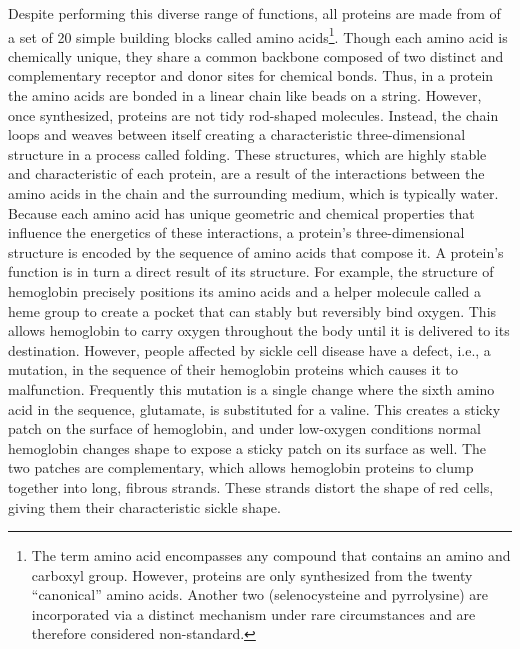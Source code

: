 Despite performing this diverse range of functions, all proteins are made from of a set of 20 simple building blocks called amino acids\footnote{The term amino acid encompasses any compound that contains an amino and carboxyl group. However, proteins are only synthesized from the twenty ``canonical'' amino acids. Another two (selenocysteine and pyrrolysine) are incorporated via a distinct mechanism under rare circumstances and are therefore considered non-standard.}. Though each amino acid is chemically unique, they share a common backbone composed of two distinct and complementary receptor and donor sites for chemical bonds. Thus, in a protein the amino acids are bonded in a linear chain like beads on a string. However, once synthesized, proteins are not tidy rod-shaped molecules. Instead, the chain loops and weaves between itself creating a characteristic three-dimensional structure in a process called folding. These structures, which are highly stable and characteristic of each protein, are a result of the interactions between the amino acids in the chain and the surrounding medium, which is typically water. Because each amino acid has unique geometric and chemical properties that influence the energetics of these interactions, a protein's three-dimensional structure is encoded by the sequence of amino acids that compose it. A protein's function is in turn a direct result of its structure. For example, the structure of hemoglobin precisely positions its amino acids and a helper molecule called a heme group to create a pocket that can stably but reversibly bind oxygen. This allows hemoglobin to carry oxygen throughout the body until it is delivered to its destination. However, people affected by sickle cell disease have a defect, i.e., a mutation, in the sequence of their hemoglobin proteins which causes it to malfunction. Frequently this mutation is a single change where the sixth amino acid in the sequence, glutamate, is substituted for a valine. This creates a sticky patch on the surface of hemoglobin, and under low-oxygen conditions normal hemoglobin changes shape to expose a sticky patch on its surface as well. The two patches are complementary, which allows hemoglobin proteins to clump together into long, fibrous strands. These strands distort the shape of red cells, giving them their characteristic sickle shape.

